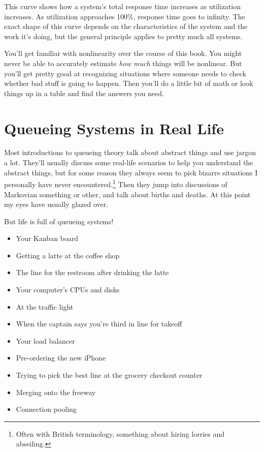 \documentclass{vivid_layout}
\begin{document}
This curve shows how a system's total response time increases as utilization increases. As utilization approaches 100\%, response time goes to infinity. The exact shape of this curve depends on the characteristics of the system and the work it's doing, but the general principle applies to pretty much all systems.

You'll get familiar with nonlinearity over the course of this book. You might never be able to accurately estimate {\itshape how much} things will be nonlinear. But you'll get pretty good at recognizing situations where someone needs to check whether bad stuff is going to happen. Then you'll do a little bit of math or look things up in a table and find the answers you need.

\section{Queueing Systems in Real Life}

Most introductions to queueing theory talk about abstract things and use jargon a lot. They'll usually discuss some real-life scenarios to help you understand the abstract things, but for some reason they always seem to pick bizarre situations I personally have never encountered.\footnote{Often with British terminology, something about hiring lorries and abseiling.} Then they jump into discussions of Markovian something or other, and talk about births and deaths. At this point my eyes have usually glazed over.

But life is full of queueing systems!
\begin{itemize}
\item Your Kanban board
\item Getting a latte at the coffee shop
\item The line for the restroom after drinking the latte
\item Your computer's CPUs and disks
\item At the traffic light
\item When the captain says you're third in line for takeoff
\item Your load balancer
\item Pre-ordering the new iPhone
\item Trying to pick the best line at the grocery checkout counter
\item Merging onto the freeway
\item Connection pooling
\end{itemize}
\end{document}
